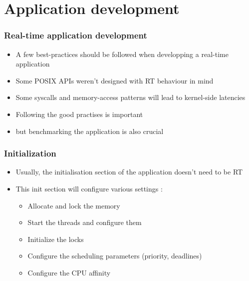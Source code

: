 \section{Application development}

\begin{frame}
\frametitle{Real-time application development}
	\begin{itemize}
		\item A few best-practices should be followed when developping a real-time application
		\item Some POSIX APIs weren't designed with RT behaviour in mind
		\item Some syscalls and memory-access patterns will lead to kernel-side latencies
		\item Following the good practises is important
		\item but benchmarking the application is also crucial
	\end{itemize}
\end{frame}

\begin{frame}
	\frametitle{Initialization}
	\begin{itemize}
		\item Usually, the initialisation section of the application doesn't need to be RT
		\item This init section will configure various settings :
			\begin{itemize}
				\item Allocate and lock the memory
				\item Start the threads and configure them
				\item Initialize the locks
				\item Configure the scheduling parameters (priority, deadlines)
				\item Configure the CPU affinity
			\end{itemize}

	\end{itemize}
\end{frame}

